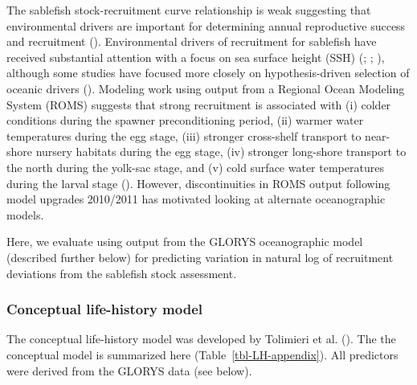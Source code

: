 \documentclass[
  english,
]{article}
\begin{document}
The sablefish stock-recruitment curve relationship is weak suggesting
that environmental drivers are important for determining annual
reproductive success and recruitment
().
Environmental drivers of recruitment for sablefish have received
substantial attention with a focus on sea surface height (SSH)
(;
;
), although
some studies have focused more closely on hypothesis-driven selection of
oceanic drivers (). Modeling work using output from a Regional Ocean Modeling
System (ROMS) suggests that strong recruitment is associated with (i)
colder conditions during the spawner preconditioning period, (ii) warmer
water temperatures during the egg stage, (iii) stronger cross-shelf
transport to near-shore nursery habitats during the egg stage, (iv)
stronger long-shore transport to the north during the yolk-sac stage,
and (v) cold surface water temperatures during the larval stage
().
However, discontinuities in ROMS output following model upgrades
2010/2011 has motivated looking at alternate oceanographic models.

Here, we evaluate using output from the GLORYS oceanographic model
(described further below) for predicting variation in natural log of
recruitment deviations from the sablefish stock assessment.

\subsubsection{Conceptual life-history model}\label{sec-lh}

The conceptual life-history model was developed by Tolimieri et al.
(). The the conceptual
model is summarized here (Table~\ref{tbl-LH-appendix}). All predictors
were derived from the GLORYS data (see below).

\newpage
\end{document}
